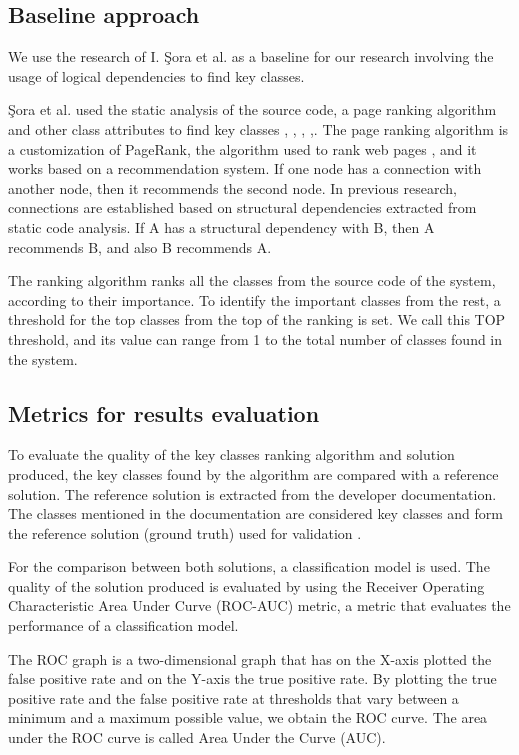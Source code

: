 \documentclass[runningheads]{comsis2}
\begin{document}
\subsection{Baseline approach}
\label{sec:baseline_approach_sub}
We use the research of I. Şora et al. \cite{Finding-key-classes} as a baseline for our research involving the usage of logical dependencies to find key classes. 

Şora et al. used the static analysis of the source code, a page ranking algorithm and other class attributes to find key classes \cite{PagerankENASE}, \cite{enase15}, \cite{SoraSpringer}, \cite{PagerankSACI},\cite{Finding-key-classes}.
The page ranking algorithm is a customization of PageRank, the algorithm used to rank web pages \cite{ilprints422}, and it works based on a recommendation system. If one node has a connection with another node, then it recommends the second node. In previous research, connections are established based on structural dependencies extracted from static code analysis. If A has a structural dependency with B, then A recommends B, and also B recommends A.

The ranking algorithm ranks all the classes from the source code of the system, according to their importance. To identify the important classes from the rest, a threshold for the top classes from the top of the ranking is set. We call this TOP threshold, and its value can range from 1 to the total number of classes found in the system. 

\subsection{Metrics for results evaluation}
\label{sec:evalmetrics}
To evaluate the quality of the key classes ranking algorithm and solution produced, the key classes found by the algorithm are compared with a reference solution. The reference solution is extracted from the developer documentation. The classes mentioned in the documentation are considered key classes and form the reference solution (ground truth) used for validation \cite{7551990}.

For the comparison between both solutions, a classification model is used. The quality of the solution produced is evaluated by using the Receiver Operating Characteristic Area Under Curve (ROC-AUC) metric, a metric that evaluates the performance of a classification model.


The ROC graph is a two-dimensional graph that has on the X-axis plotted the false positive rate and on the Y-axis the true positive rate. By plotting the true positive rate and the false positive rate at thresholds that vary between a minimum and a maximum possible value, we obtain the ROC curve. The area under the ROC curve is called Area Under the Curve (AUC).
\end{document}
